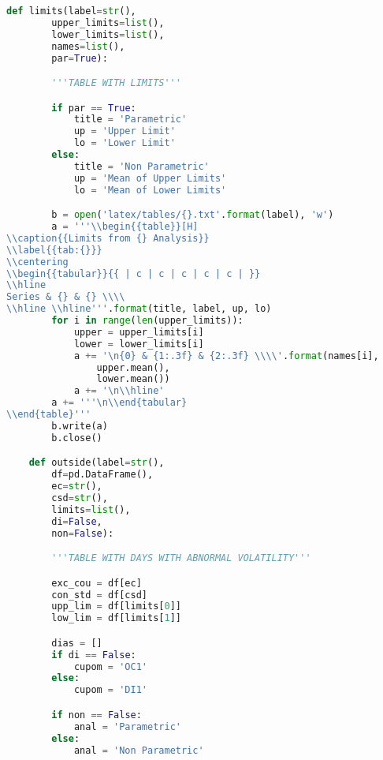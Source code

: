 \begin{lstlisting}[language=Python]
    def limits(label=str(),
        upper_limits=list(),
        lower_limits=list(),
        names=list(),
        par=True):

        '''TABLE WITH LIMITS'''

        if par == True:
            title = 'Parametric'
            up = 'Upper Limit'
            lo = 'Lower Limit'
        else:
            title = 'Non Parametric'
            up = 'Mean of Upper Limits'
            lo = 'Mean of Lower Limits'

        b = open('latex/tables/{}.txt'.format(label), 'w')
        a = '''\\begin{{table}}[H]
\\caption{{Limits from {} Analysis}}
\\label{{tab:{}}}
\\centering
\\begin{{tabular}}{{ | c | c | c | c | c | }}
\\hline
Series & {} & {} \\\\
\\hline \\hline'''.format(title, label, up, lo)
        for i in range(len(upper_limits)):
            upper = upper_limits[i]
            lower = lower_limits[i]
            a += '\n{0} & {1:.3f} & {2:.3f} \\\\'.format(names[i],
                upper.mean(),
                lower.mean())
            a += '\n\\hline'
        a += '''\n\\end{tabular}
\\end{table}'''
        b.write(a)
        b.close()

    def outside(label=str(),
        df=pd.DataFrame(),
        ec=str(),
        csd=str(),
        limits=list(),
        di=False,
        non=False):

        '''TABLE WITH DAYS WITH ABNORMAL VOLATILITY'''

        exc_cou = df[ec]
        con_std = df[csd]
        upp_lim = df[limits[0]]
        low_lim = df[limits[1]]

        dias = []
        if di == False:
            cupom = 'OC1'
        else:
            cupom = 'DI1'

        if non == False:
            anal = 'Parametric'
        else:
            anal = 'Non Parametric'


\end{lstlisting}
